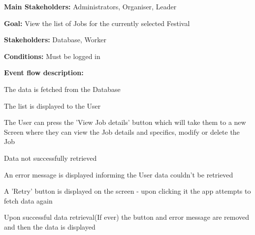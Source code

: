 				\noindent {}
				\begin{packed_item}
					\item \textbf{Main Stakeholders:} Administrators, Organiser, Leader
					\item \textbf{Goal:} View the list of Jobs for the currently selected Festival
					\item \textbf{Stakeholders: } Database, Worker
					\item \textbf{Conditions: } Must be logged in
					\item \textbf{Event flow description: }
					\begin{packed_enum}
						\item The data is fetched from the Database
						\item The list is displayed to the User
						\item The User can press the 'View Job details' button which will take them to a new Screen where they can view the Job details and specifics, modify or delete the Job
					\end{packed_enum}
					
					\begin{packed_item}
						\item[1.a] Data not successfully retrieved
						\item[] \begin{packed_enum}
							\item An error message is displayed informing the User data couldn't be retrieved
							\item A 'Retry' button is displayed on the screen - upon clicking it the app attempts to fetch data again
							\item Upon successful data retrieval(If ever) the button and error message are removed and then the data is displayed
						\end{packed_enum}
					\end{packed_item}
				\end{packed_item}
			

